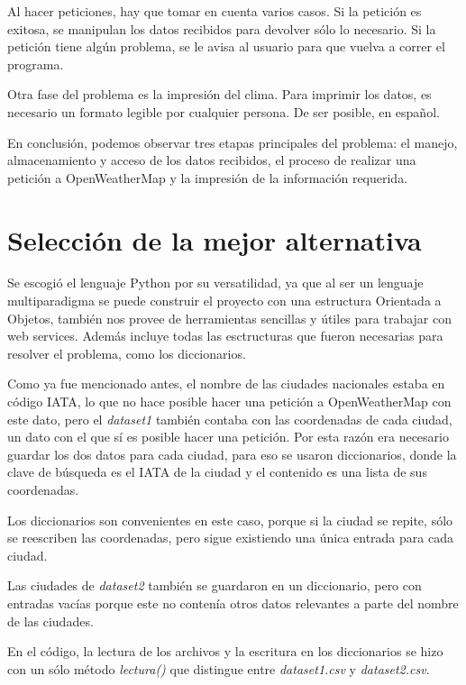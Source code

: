 \documentclass[]{article}
\begin{document}
Al hacer peticiones, hay que tomar en cuenta varios casos. Si la petición 
es exitosa, se manipulan los datos recibidos para devolver sólo lo 
necesario. Si la petición tiene algún problema, se le avisa al usuario para 
que vuelva a correr el programa. 

Otra fase del problema es la impresión del clima. Para imprimir los datos, es 
necesario un formato legible por cualquier persona. De ser posible, en 
español.

En conclusión, podemos observar tres etapas principales del problema: 
el manejo, almacenamiento y acceso de los datos recibidos, el proceso de 
realizar una petición a OpenWeatherMap y la impresión de la información 
requerida.

\section{Selección de la mejor alternativa}

Se escogió el lenguaje Python por su versatilidad, ya que al ser un lenguaje 
multiparadigma se puede construir el proyecto con una estructura Orientada 
a Objetos, también nos provee de herramientas sencillas y útiles para trabajar 
con web services. Además incluye todas las esctructuras que fueron 
necesarias para resolver el problema, como los diccionarios.

Como ya fue mencionado antes, el nombre de las ciudades nacionales estaba 
en código IATA, lo que no hace posible hacer una petición a OpenWeatherMap 
con este dato, pero el \emph{dataset1} también contaba con las coordenadas 
de cada ciudad, un dato con el que sí es posible hacer una petición. Por esta 
razón era necesario guardar los dos datos para cada ciudad, para eso se 
usaron diccionarios, donde la clave de búsqueda es el IATA de la ciudad y el 
contenido es una lista de sus coordenadas.

Los diccionarios son convenientes en este caso, porque si la ciudad se repite, 
sólo se reescriben las coordenadas, pero sigue existiendo una única entrada 
para cada ciudad.

Las ciudades de \emph{dataset2} también se guardaron en un diccionario, 
pero con entradas vacías porque este no contenía otros datos relevantes a 
parte del nombre de las ciudades.

En el código, la lectura de los archivos y la escritura en los diccionarios se 
hizo con un sólo método \emph{lectura()} que distingue entre
\emph{dataset1.csv} y \emph{dataset2.csv}.
\end{document}
